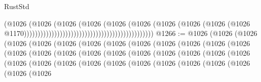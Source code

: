 \begin{lexlean}{RustStd}
\begin{coremodule}
                                                                              (@1026
                                                                                (@1026
                                                                                  (@1026
                                                                                    (@1026
                                                                                      (@1026
                                                                                        (@1026
                                                                                          (@1026
                                                                                            (@1026
                                                                                              (@1026
                                                                                                (@1026
                                                                                                  @1170)))))))))))))))))))))))))))))))))))))))))))))))
@1266 := @1026
    (@1026
      (@1026
        (@1026
          (@1026
            (@1026
              (@1026
                (@1026
                  (@1026
                    (@1026
                      (@1026
                        (@1026
                          (@1026
                            (@1026
                              (@1026
                                (@1026
                                  (@1026
                                    (@1026
                                      (@1026
                                        (@1026
                                          (@1026
                                            (@1026
                                              (@1026
                                                (@1026
                                                  (@1026
                                                    (@1026
                                                      (@1026
                                                        (@1026
                                                          (@1026
                                                            (@1026
                                                              (@1026
                                                                (@1026
                                                                  (@1026
                                                                    (@1026
                                                                      (@1026

\end{coremodule}
\end{lexlean}
